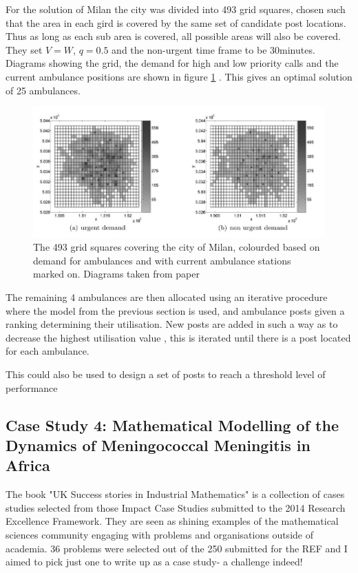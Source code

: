 \documentclass[11pt]{article} %
\begin{document}
 
For the solution of Milan the city was divided into 493 grid squares, chosen such that the area in each gird is covered by the same set of candidate post locations. Thus as long as each sub area is covered, all possible areas will also be covered. They set $ V=W $, $ q=0.5 $ and the non-urgent time frame to be 30minutes. Diagrams showing the grid, the demand for high and low priority calls and the current ambulance positions are shown in figure \ref{fig:ems-milan} . This gives an optimal solution of 25 ambulances.

\begin{figure}
	\centering
	\includegraphics[width=0.9\linewidth]{"Report_images/ems milan"}
	\caption{The 493 grid squares covering the city of Milan, colourded based on demand for ambulances and with current ambulance stations marked on. Diagrams taken from paper \cite{Carello2013}}
	\label{fig:ems-milan}
\end{figure}

The remaining 4 ambulances are then allocated using an iterative procedure where the model from the previous section is used, and ambulance posts given  a ranking determining their utilisation. New posts are added in such a way as to decrease the highest utilisation value , this is iterated until there is a post located for each ambulance. 

This could also be used to design a set of posts to reach a threshold level of performance
	\subsection{Case Study 4: Mathematical Modelling of the Dynamics of Meningococcal Meningitis in Africa \label{Africa }}
The book "UK Success stories in Industrial Mathematics" \cite{Aston2016} is a collection of cases studies selected from those Impact Case Studies submitted to the 2014 Research Excellence Framework. They are seen as shining examples of the mathematical sciences community engaging with problems and organisations outside of academia. 36 problems were selected out of the 250 submitted for the REF and I aimed to pick just one to write up as a case study- a challenge indeed!
\end{document}
